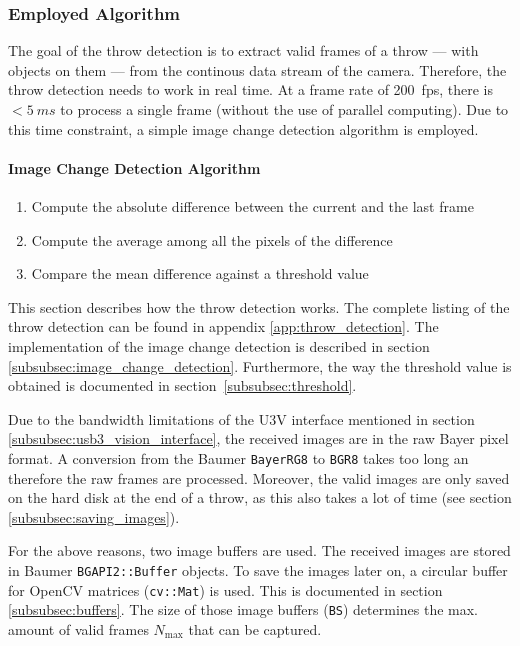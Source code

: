 \subsubsection{Employed Algorithm}
\label{subsubsec:algorithm}

The goal of the throw detection is to extract valid frames of a throw --- with objects on them --- from the continous data stream of the camera.
Therefore, the throw detection needs to work in real time.
At a frame rate of \SI{200}{fps}, there is $<\SI{5}{ms}$ to process a single frame (without the use of parallel computing).
Due to this time constraint, a simple image change detection algorithm is employed.

\paragraph{Image Change Detection Algorithm}
\vspace{-15pt}
\begin{enumerate}
  \item Compute the absolute difference between the current and the last frame
  \item Compute the average among all the pixels of the difference
  \item Compare the mean difference against a threshold value
\end{enumerate}

This section describes how the throw detection works.
The complete listing of the throw detection can be found in appendix \ref{app:throw_detection}.
The implementation of the image change detection is described in section \ref{subsubsec:image_change_detection}.
Furthermore, the way the threshold value is obtained is documented in section~\ref{subsubsec:threshold}.

Due to the bandwidth limitations of the U3V interface mentioned in section \ref{subsubsec:usb3_vision_interface}, the received images are in the raw Bayer pixel format.
A conversion from the Baumer \texttt{BayerRG8} to \texttt{BGR8} takes too long an therefore the raw frames are processed.
Moreover, the valid images are only saved on the hard disk at the end of a throw, as this also takes a lot of time (see section \ref{subsubsec:saving_images}).

For the above reasons, two image buffers are used.
The received images are stored in Baumer \texttt{BGAPI2::Buffer} objects.
To save the images later on, a circular buffer for OpenCV matrices (\texttt{cv::Mat}) is used.
This is documented in section \ref{subsubsec:buffers}.
The size of those image buffers (\texttt{BS}) determines the max. amount of valid frames $N_\text{max}$ that can be captured.

